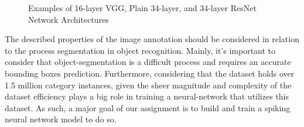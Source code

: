 \begin{wrapfigure}[25]{r}{0.42\textwidth}
	\begin{center}
	\end{center}
		\caption{Examples of 16-layer VGG, Plain 34-layer, and 34-layer ResNet Network 
		Architectures}
\end{wrapfigure}

The described properties of the image annotation should be considered in relation to the process segmentation in object recognition. Mainly, it’s important to consider that object-segmentation is a difficult process and requires an accurate bounding boxes prediction. Furthermore, considering that the dataset holds over 1.5 million category instances, given the sheer magnitude and complexity of the dataset efficiency plays a big role in training a neural-network that utilizes this dataset. As such, a major goal of our assignment is to build and train a spiking neural network model to do so.  

